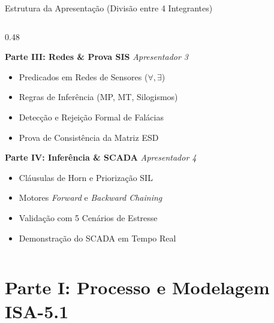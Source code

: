 \documentclass[aspectratio=169, 10pt]{beamer}
\begin{document}
\begin{frame}{Estrutura da Apresentação (Divisão entre 4 Integrantes)}
\begin{columns}[t]
    \begin{column}{0.48\textwidth}
      \begin{block}{\textbf{Parte III: Redes \& Prova SIS} \hfill \textit{Apresentador 3}}
        \footnotesize
        \begin{itemize}
          \item Predicados em Redes de Sensores ($\forall, \exists$)
          \item Regras de Inferência (MP, MT, Silogismos)
          \item Detecção e Rejeição Formal de Falácias
          \item Prova de Consistência da Matriz ESD
        \end{itemize}
      \end{block}
      \vspace{0.2cm}
      \begin{block}{\textbf{Parte IV: Inferência \& SCADA} \hfill \textit{Apresentador 4}}
        \footnotesize
        \begin{itemize}
          \item Cláusulas de Horn e Priorização SIL
          \item Motores \textit{Forward} e \textit{Backward Chaining}
          \item Validação com 5 Cenários de Estresse
          \item Demonstração do SCADA em Tempo Real
        \end{itemize}
      \end{block}
    \end{column}
  \end{columns}
\end{frame}

\section{Parte I: Processo e Modelagem ISA-5.1}
\end{document}
